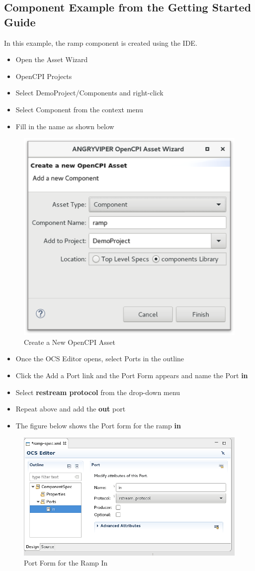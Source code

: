 \documentclass[10pt, a4paper, oneside]{article}
\begin{document}
\subsection{Component Example from the Getting Started Guide}
In this example, the ramp component is created using the IDE.
\begin{itemize}
\item Open the Asset Wizard
\item OpenCPI Projects
\item Select DemoProject/Components and right-click
\item Select Component from the context menu
\item Fill in the name as shown below
\end{itemize}
\begin{figure}[h!]
	\centering
	\caption{Create a New OpenCPI Asset}\label{fig:CreateaNewOpenCPIAsset}
	\includegraphics[width=.65\textwidth]{AssetWizard.png}
 \end{figure}
\begin{itemize}
\item Once the OCS Editor opens, select Ports in the outline
\item Click the Add a Port link and the Port Form appears and name the Port \textbf{in}
\item Select \textbf{restream protocol} from the drop-down menu
\item Repeat above and add the \textbf{out} port
\item The figure below shows the Port form for the ramp \textbf{in}
\end{itemize}
\begin{figure}[h!]
	\centering
	\caption{Port Form for the Ramp In}\label{fig:PortFormfortheRampIn}
	\includegraphics[width=.85\textwidth]{PortFormfortheRampIn.png}
 \end{figure}
\end{document}
